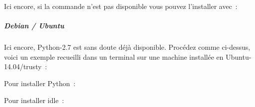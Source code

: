     Ici encore, si la commande n'est pas disponible vous pouvez l'installer
avec~:

    \begin{Shaded}
\begin{Highlighting}[frame=lines,framerule=0.6mm,rulecolor=\color{asisframecolor}]
\NormalTok{$ }
\end{Highlighting}
\end{Shaded}

    \hypertarget{debian-ubuntu}{%
\subparagraph{Debian / Ubuntu}\label{debian-ubuntu}}

    Ici encore, Python-2.7 est sans doute déjà disponible. Procédez comme
ci-dessus, voici un exemple recueilli dans un terminal sur une machine
installée en Ubuntu-14.04/trusty~:

    \begin{Shaded}
\begin{Highlighting}[frame=lines,framerule=0.6mm,rulecolor=\color{asisframecolor}]
\NormalTok{$ }
\NormalTok{[}\NormalTok{ 6.3.1 20161221 (Red Hat 6.3.1-1)] }
 \NormalTok{, }\NormalTok{, }
\OperatorTok{>>>} 
\end{Highlighting}
\end{Shaded}

    Pour installer Python~:

    \begin{Shaded}
\begin{Highlighting}[frame=lines,framerule=0.6mm,rulecolor=\color{asisframecolor}]
\NormalTok{$ }
\end{Highlighting}
\end{Shaded}

    Pour installer idle~:

    \begin{Shaded}
\begin{Highlighting}[frame=lines,framerule=0.6mm,rulecolor=\color{asisframecolor}]
\NormalTok{$ }
\end{Highlighting}
\end{Shaded}

